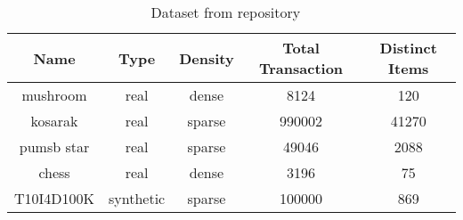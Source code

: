 \begin{table}[t]
\centering
\begin{tabular}{|c|c|c|c|c|}
\hline 
Name&Type&Density&Total Transaction &Distinct Items\\ \hline \hline
mushroom	&	real	&	dense	&	8124	&	120\\ \hline
kosarak	&	real	&	sparse	&	990002	&	41270\\ \hline
pumsb star	&	real	&	sparse	&	49046	&	2088\\ \hline
chess	&	real	&	dense	&	3196	&	75\\ \hline
T10I4D100K	&	synthetic	&	sparse	&	100000	&	869\\ \hline
	\end{tabular}
\caption{Dataset from repository ~\cite{dataset}}
\label{table:dataset}
\end{table}
